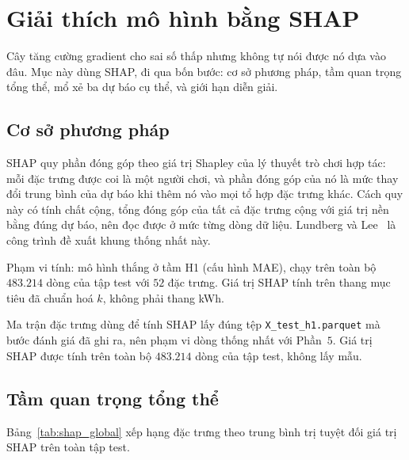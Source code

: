 \FloatBarrier
\section{Giải thích mô hình bằng SHAP}

Cây tăng cường gradient cho sai số thấp nhưng không tự nói được nó dựa vào đâu. Mục này dùng
SHAP, đi qua bốn bước: cơ sở phương pháp, tầm quan trọng tổng thể, mổ xẻ ba dự báo cụ thể, và
giới hạn diễn giải.

\FloatBarrier
\subsection{Cơ sở phương pháp}

SHAP quy phần đóng góp theo giá trị Shapley của lý thuyết trò chơi hợp tác: mỗi đặc trưng được
coi là một người chơi, và phần đóng góp của nó là mức thay đổi trung bình của dự báo khi thêm
nó vào mọi tổ hợp đặc trưng khác. Cách quy này có tính chất cộng, tổng đóng góp của tất cả
đặc trưng cộng với giá trị nền bằng đúng dự báo, nên đọc được ở mức từng dòng dữ liệu.
Lundberg và Lee~\cite{lundberg2017shap} là công trình đề xuất khung thống nhất này.



Phạm vi tính: mô hình thắng ở tầm H1 (cấu hình MAE), chạy trên toàn bộ $483.214$ dòng của tập
test với $52$ đặc trưng. Giá trị SHAP tính trên thang mục tiêu đã chuẩn hoá $k$, không phải
thang kWh.

Ma trận đặc trưng dùng để tính SHAP lấy đúng tệp \texttt{X\_test\_h1.parquet} mà bước đánh giá đã
ghi ra, nên phạm vi dòng thống nhất với Phần~$5$. Giá trị SHAP được tính trên toàn bộ
$483.214$ dòng của tập test, không lấy mẫu.

\FloatBarrier
\subsection{Tầm quan trọng tổng thể}

Bảng~\ref{tab:shap_global} xếp hạng đặc trưng theo
trung bình trị tuyệt đối giá trị SHAP trên toàn tập test.

